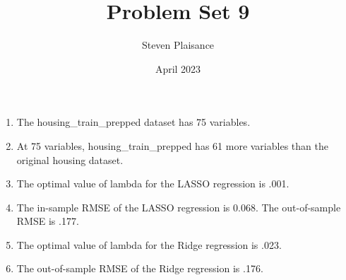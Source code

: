 \documentclass{article}
\title{Problem Set 9}
\author{Steven Plaisance}
\date{April 2023}
\begin{document}
\maketitle

\begin{enumerate}
  \item The housing\_train\_prepped dataset has 75 variables.
  \item At 75 variables, housing\_train\_prepped has 61 more variables than the original housing dataset.
  \item The optimal value of lambda for the LASSO regression is .001.
  \item The in-sample RMSE of the LASSO regression is 0.068. The out-of-sample RMSE is .177.
  \item The optimal value of lambda for the Ridge regression is .023.
  \item The out-of-sample RMSE of the Ridge regression is .176.
  
\end{enumerate}
\end{document}
